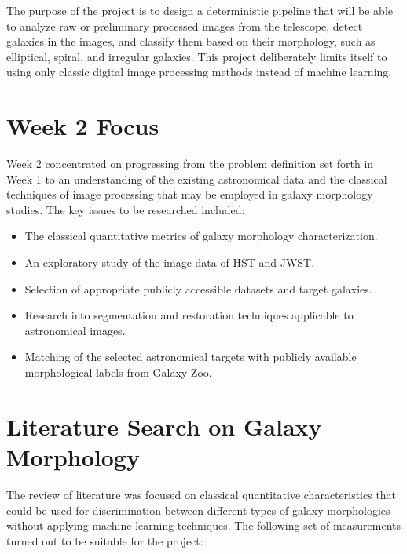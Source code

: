 \documentclass[11pt]{article}
\begin{document}
The purpose of the project is to design a deterministic pipeline that will be able to analyze raw or preliminary processed images from the telescope, detect galaxies in the images, and classify them based on their morphology, such as elliptical, spiral, and irregular galaxies. This project deliberately limits itself to using only classic digital image processing methods instead of machine learning.


\section{Week 2 Focus}

Week 2 concentrated on progressing from the problem definition set forth in Week 1 to an understanding of the existing
astronomical data and the classical techniques of image processing that may be employed in galaxy morphology studies. The key issues to be researched included:

\begin{itemize}
    \item The classical quantitative metrics of galaxy morphology characterization.
    \item An exploratory study of the image data of HST and JWST.
    \item Selection of appropriate publicly accessible datasets and target galaxies.
    \item Research into segmentation and restoration techniques applicable to astronomical images.
    \item Matching of the selected astronomical targets with publicly available morphological labels from Galaxy Zoo.
\end{itemize}


\section{Literature Search on Galaxy Morphology}

The review of literature was focused on classical quantitative characteristics that could be used for discrimination between different types of galaxy morphologies without applying machine learning techniques.
The following set of measurements turned out to be suitable for the project:
\end{document}
